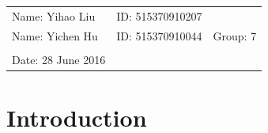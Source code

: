 \documentclass{article}
\begin{document}
\vspace*{0.25cm}

\hrulefill

\thispagestyle{empty}

\begin{center}
\begin{large}
\end{large}

\hrulefill

\vspace*{5cm}
\begin{Large}
\end{Large}

\vspace{2em}

\begin{large}
\end{large}
\end{center}


\vfill

\begin{table}[h!]
\flushleft
\begin{tabular}{lll}
Name: Yihao Liu \hspace*{2em}&
ID: 515370910207\hspace*{2em}\\
Name: Yichen Hu \hspace*{2em}&
ID: 515370910044\hspace*{2em}
& Group: 7\\


\\

Date: 28 June 2016 

\end{tabular}
\end{table}

\hfill
\begin{tiny}
[rev. 1.0]
\end{tiny}
\newpage

\section{Introduction}
\end{document}
